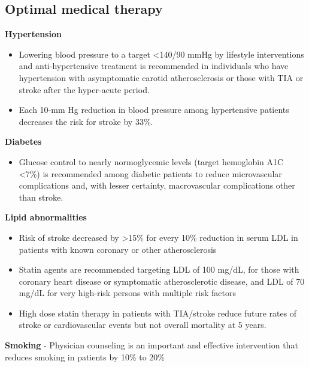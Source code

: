 \documentclass[
]{book}
\providecommand{\tightlist}{%
  \setlength{\itemsep}{0pt}\setlength{\parskip}{0pt}}
\begin{document}
\hypertarget{optimal-medical-therapy}{%
\subsection{\texorpdfstring{\textbf{Optimal medical therapy}}{Optimal medical therapy}}\label{optimal-medical-therapy}}

\textbf{Hypertension}

\begin{itemize}
\item
  Lowering blood pressure to a target \textless140/90 mmHg by lifestyle
  interventions and anti-hypertensive treatment is recommended in
  individuals who have hypertension with asymptomatic carotid
  atherosclerosis or those with TIA or stroke after the hyper-acute
  period.
\item
  Each 10-mm Hg reduction in blood pressure among hypertensive
  patients decreases the risk for stroke by 33\%.
\end{itemize}

\textbf{Diabetes}

\begin{itemize}
\tightlist
\item
  Glucose control to nearly normoglycemic levels (target hemoglobin
  A1C \textless7\%) is recommended among diabetic patients to reduce
  microvascular complications and, with lesser certainty,
  macrovascular complications other than stroke.
\end{itemize}

\textbf{Lipid abnormalities}

\begin{itemize}
\item
  Risk of stroke decreased by \textgreater15\% for every 10\% reduction in serum
  LDL in patients with known coronary or other atherosclerosis
\item
  Statin agents are recommended targeting LDL of 100 mg/dL, for those
  with coronary heart disease or symptomatic atherosclerotic disease,
  and LDL of 70 mg/dL for very high-risk persons with multiple risk
  factors
\item
  High dose statin therapy in patients with TIA/stroke reduce future
  rates of stroke or cardiovascular events but not overall mortality
  at 5 years. \citep{karamHighDoseAtorvastatinStroke2008}
\end{itemize}

\textbf{Smoking} - Physician counseling is an important and effective
intervention that reduces smoking in patients by 10\% to 20\%
\end{document}
